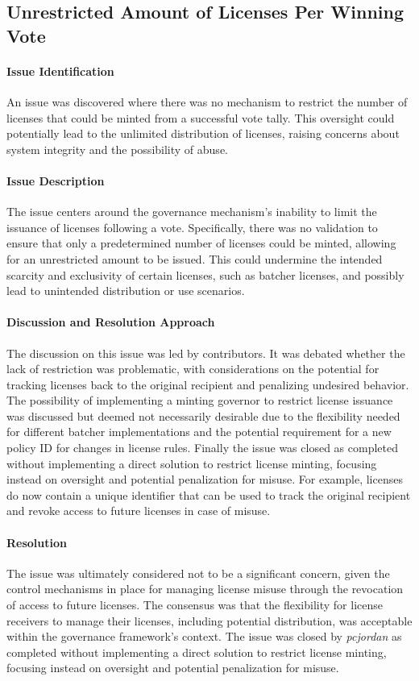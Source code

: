 \documentclass[11pt]{article}
\begin{document}
\subsection{Unrestricted Amount of Licenses Per Winning Vote}

\paragraph{Issue Identification}
An issue was discovered where there was no mechanism to restrict the number of licenses that could be minted from a successful vote tally.
This oversight could potentially lead to the unlimited distribution of licenses, raising concerns about system integrity and the possibility of abuse.

\paragraph{Issue Description}
The issue centers around the governance mechanism's inability to limit the issuance of licenses following a vote.
Specifically, there was no validation to ensure that only a predetermined number of licenses could be minted, allowing for an unrestricted amount to be issued.
This could undermine the intended scarcity and exclusivity of certain licenses, such as batcher licenses, and possibly lead to unintended distribution or use scenarios.

\paragraph{Discussion and Resolution Approach}
The discussion on this issue was led by contributors.
It was debated whether the lack of restriction was problematic, with considerations on the potential for tracking licenses back to the original recipient and penalizing undesired behavior.
The possibility of implementing a minting governor to restrict license issuance was discussed but deemed not necessarily desirable due to the flexibility needed for different batcher implementations and the potential requirement for a new policy ID for changes in license rules.
Finally the issue was closed as completed without implementing a direct solution to restrict license minting, focusing instead on oversight and potential penalization for misuse.
For example, licenses do now contain a unique identifier that can be used to track the original recipient and revoke access to future licenses in case of misuse.

\paragraph{Resolution}
The issue was ultimately considered not to be a significant concern, given the control mechanisms in place for managing license misuse through the revocation of access to future licenses. The consensus was that the flexibility for license receivers to manage their licenses, including potential distribution, was acceptable within the governance framework's context. The issue was closed by \textit{pcjordan} as completed without implementing a direct solution to restrict license minting, focusing instead on oversight and potential penalization for misuse.
\end{document}
